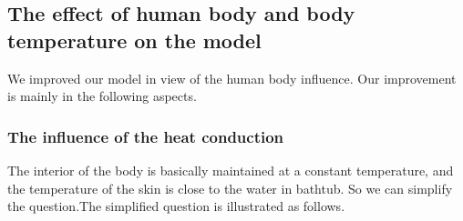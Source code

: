 \documentclass{mcmthesis}
\begin{document}
\subsection{The effect of human body and body temperature on the model}
We improved our model in view of the human body influence. Our improvement is mainly in the following aspects.
\subsubsection{The influence of the heat conduction}%
The interior of the body is basically maintained at a constant temperature, and the temperature of the skin is close to the water in bathtub. So we can simplify the question.The simplified question is illustrated as follows.\\
\end{document}
